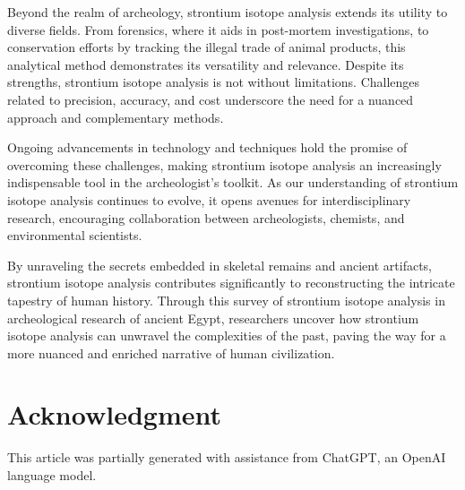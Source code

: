 \documentclass[a4paper, 12pt]{article}
\begin{document}
Beyond the realm of archeology, strontium isotope analysis extends its utility
to diverse fields. From forensics, where it aids in post-mortem investigations,
to conservation efforts by tracking the illegal trade of animal products, this
analytical method demonstrates its versatility and relevance.
Despite its strengths, strontium isotope analysis is not without
limitations. Challenges related to precision, accuracy, and cost underscore the
need for a nuanced approach and complementary methods.

Ongoing advancements in technology and techniques hold the
promise of overcoming these challenges, making strontium isotope analysis an
increasingly indispensable tool in the archeologist's toolkit. As our
understanding of strontium isotope analysis continues to evolve, it opens
avenues for interdisciplinary research, encouraging collaboration between
archeologists, chemists, and environmental scientists.

By unraveling the secrets embedded in skeletal remains and ancient artifacts,
strontium isotope analysis contributes significantly to reconstructing the
intricate tapestry of human history. Through this survey of strontium isotope
analysis in archeological research of ancient Egypt, researchers uncover how
strontium isotope analysis can unwravel the complexities of the past,
paving the way for a more nuanced and enriched narrative of human civilization.

\section{Acknowledgment}

This article was partially generated with assistance from ChatGPT, an OpenAI language model.



\end{document}
